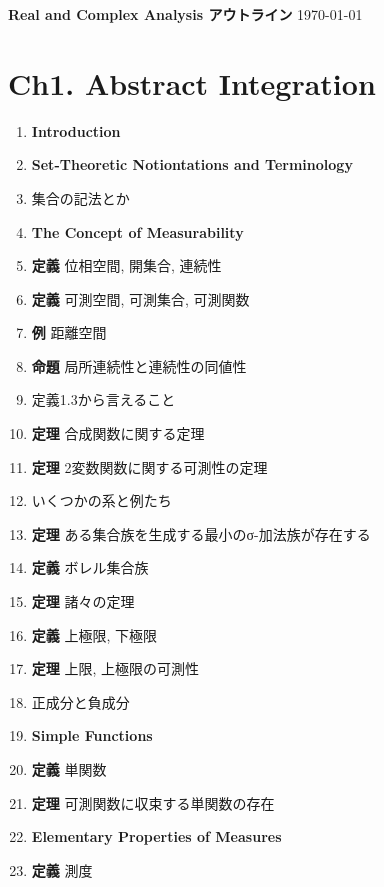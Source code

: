 \documentclass[a4paper,18pt]{jsarticle}
\begin{document}
\begin{tcolorbox}
  {\Large \bf Real and Complex Analysis アウトライン} \hfill  \today
\end{tcolorbox}

\section*{Ch1. Abstract Integration}

\begin{enumerate}
  \item[] \hspace{-8mm}\textbf{Introduction}
  \item[] \hspace{-8mm}\textbf{Set-Theoretic Notiontations and Terminology}
  \item 集合の記法とか
  \item[] \hspace{-8mm}\textbf{The Concept of Measurability}
  \item \textbf{定義} 位相空間, 開集合, 連続性
  \item \textbf{定義} 可測空間, 可測集合, 可測関数
  \item \textbf{例} 距離空間
  \item \textbf{命題} 局所連続性と連続性の同値性
  \item 定義1.3から言えること
  \item \textbf{定理} 合成関数に関する定理
  \item \textbf{定理} 2変数関数に関する可測性の定理
  \item いくつかの系と例たち
  \item \textbf{定理} ある集合族を生成する最小のσ-加法族が存在する
  \item \textbf{定義} ボレル集合族
  \item \textbf{定理} 諸々の定理
  \item \textbf{定義} 上極限, 下極限
  \item \textbf{定理} 上限, 上極限の可測性
  \item 正成分と負成分
  \item[] \hspace{-8mm}\textbf{Simple Functions}
  \item \textbf{定義} 単関数
  \item \textbf{定理} 可測関数に収束する単関数の存在
  \item[] \hspace{-8mm}\textbf{Elementary Properties of Measures}
  \item \textbf{定義} 測度

\end{enumerate}
\end{document}
